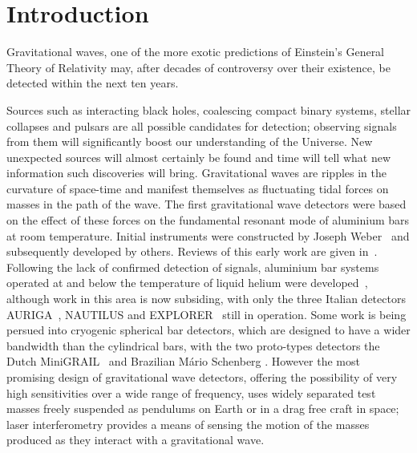 \documentclass{article}
\begin{document}

\newpage

\section{Introduction}
\label{section:introduction}

Gravitational waves, one of the more exotic predictions of Einstein's General
Theory of Relativity may, after decades of controversy over their existence, be
detected within the next ten years. 

Sources such as interacting black holes, coalescing compact binary systems,
stellar collapses and pulsars are all possible candidates for detection;
observing signals from them will significantly boost our understanding of the
Universe. New unexpected sources will almost certainly be found and time will
tell what new information such discoveries will bring. Gravitational waves are
ripples in the curvature of space-time and manifest themselves as fluctuating 
tidal forces on masses in the path of the wave. The first gravitational wave
detectors were based on the effect of these forces on the fundamental resonant
mode of aluminium bars at room temperature. Initial instruments were constructed
by Joseph Weber~\cite{Weber1, Weber2} and subsequently developed by others.
Reviews of this early work are given in~\cite{Tyson, Douglass}. Following the
lack of confirmed detection of signals, aluminium bar systems operated at and
below the temperature of liquid helium were developed~\cite{Astone, Prodi,
Amaldi, Heng},
although work in this area is now subsiding, with only the three Italian
detectors AURIGA~\cite{AURIGA}, NAUTILUS and EXPLORER~\cite{NAUTILUS} still in
operation. Some work is being persued into cryogenic spherical bar detectors,
which are designed to have a wider bandwidth than the cylindrical bars, with the
two proto-types detectors the Dutch MiniGRAIL~\cite{MiniGRAIL, Gottardi:2007}
and Brazilian M\'{a}rio Schenberg \cite{Schenberg, Aguiar:2006}. However the
most promising design of gravitational wave detectors, offering the possibility
of very high sensitivities over a wide range of frequency, uses widely separated
test masses freely suspended as pendulums on Earth or in a drag free craft in
space; laser interferometry provides a means of sensing the motion of the masses
produced as they interact with a gravitational wave.
\end{document}
